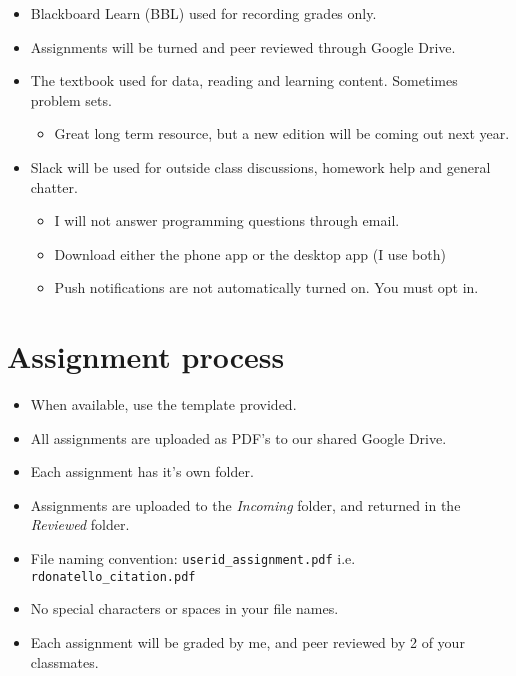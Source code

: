 \documentclass[]{article}
\providecommand{\tightlist}{%
  \setlength{\itemsep}{0pt}\setlength{\parskip}{0pt}}
\begin{document}
\begin{itemize}
\tightlist
\item
  Blackboard Learn (BBL) used for recording grades only.
\item
  Assignments will be turned and peer reviewed through Google Drive.
\item
  The textbook used for data, reading and learning content. Sometimes
  problem sets.

  \begin{itemize}
  \tightlist
  \item
    Great long term resource, but a new edition will be coming out next
    year.
  \end{itemize}
\item
  Slack will be used for outside class discussions, homework help and
  general chatter.

  \begin{itemize}
  \tightlist
  \item
    I will not answer programming questions through email.
  \item
    Download either the phone app or the desktop app (I use both)
  \item
    Push notifications are not automatically turned on. You must opt in.
  \end{itemize}
\end{itemize}

\section{Assignment process}\label{assignment-process}

\begin{itemize}
\tightlist
\item
  When available, use the template provided.
\item
  All assignments are uploaded as PDF's to our shared Google Drive.
\item
  Each assignment has it's own folder.
\item
  Assignments are uploaded to the \emph{Incoming} folder, and returned
  in the \emph{Reviewed} folder.
\item
  File naming convention: \texttt{userid\_assignment.pdf} i.e.
  \texttt{rdonatello\_citation.pdf}
\item
  No special characters or spaces in your file names.
\item
  Each assignment will be graded by me, and peer reviewed by 2 of your
  classmates.
\end{itemize}
\end{document}
